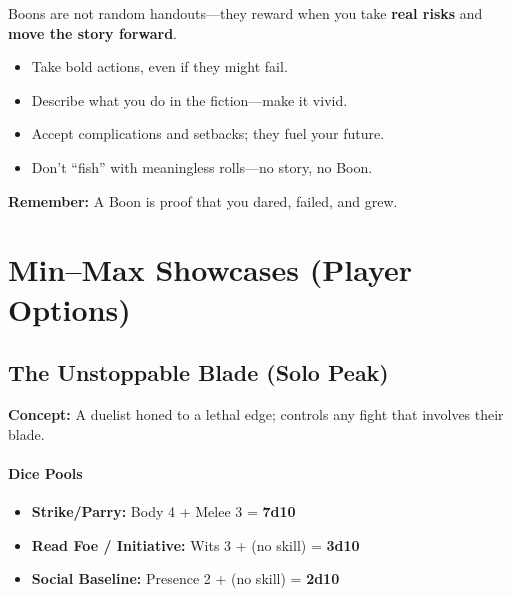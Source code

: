 \documentclass[11pt]{article}
\begin{document}
\begin{tcolorbox}[title=Player Tip: How to Earn Boons,colback=black!2,colframe=black!40!white]
  Boons are not random handouts—they reward when you take \textbf{real risks} and \textbf{move the story forward}.  
  
  \begin{itemize}
    \item Take bold actions, even if they might fail.  
    \item Describe what you do in the fiction—make it vivid.  
    \item Accept complications and setbacks; they fuel your future.  
    \item Don’t “fish” with meaningless rolls—no story, no Boon.  
  \end{itemize}
  
  \textbf{Remember:} A Boon is proof that you dared, failed, and grew.
  \end{tcolorbox}

\section*{Min–Max Showcases (Player Options)}

\subsection*{The Unstoppable Blade (Solo Peak)}
\textbf{Concept:} A duelist honed to a lethal edge; controls any fight that involves their blade.

\paragraph{Dice Pools}
\begin{itemize}
  \item \textbf{Strike/Parry:} Body 4 + Melee 3 = \textbf{7d10}
  \item \textbf{Read Foe / Initiative:} Wits 3 + (no skill) = \textbf{3d10}
  \item \textbf{Social Baseline:} Presence 2 + (no skill) = \textbf{2d10}
\end{itemize}
\end{document}
